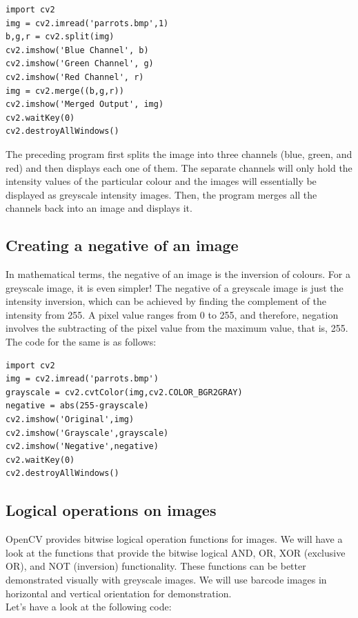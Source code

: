 \documentclass{labo}
\begin{document}
\begin{verbatim}
import cv2
img = cv2.imread('parrots.bmp',1)
b,g,r = cv2.split(img)
cv2.imshow('Blue Channel', b)
cv2.imshow('Green Channel', g)
cv2.imshow('Red Channel', r)
img = cv2.merge((b,g,r))
cv2.imshow('Merged Output', img)
cv2.waitKey(0)
cv2.destroyAllWindows()
\end{verbatim}
The preceding program first splits the image into three channels (blue, green, and red) and then displays each one of them. The separate channels will only hold the intensity values of the particular colour and the images will essentially be displayed as greyscale intensity images. Then, the program merges all the channels back into an image and displays it.


\subsection*{Creating a negative of an image}
In mathematical terms, the negative of an image is the inversion of colours. For a greyscale image, it is even simpler! The negative of a greyscale image is just the intensity inversion, which can be achieved by finding the complement of the intensity from 255. A pixel value ranges from 0 to 255, and therefore, negation involves the subtracting of the pixel value from the maximum value, that is, 255. The code for the same is as follows:

\begin{verbatim}
import cv2
img = cv2.imread('parrots.bmp')
grayscale = cv2.cvtColor(img,cv2.COLOR_BGR2GRAY)
negative = abs(255-grayscale)
cv2.imshow('Original',img)
cv2.imshow('Grayscale',grayscale)
cv2.imshow('Negative',negative)
cv2.waitKey(0)
cv2.destroyAllWindows()
\end{verbatim}


\subsection*{Logical operations on images}
OpenCV provides bitwise logical operation functions for images. We will have a look at the functions that provide the bitwise logical AND, OR, XOR (exclusive OR), and NOT (inversion) functionality. These functions can be better demonstrated visually with greyscale images. We will use barcode images in horizontal and vertical orientation for demonstration.\\

Let's have a look at the following code:
\end{document}

